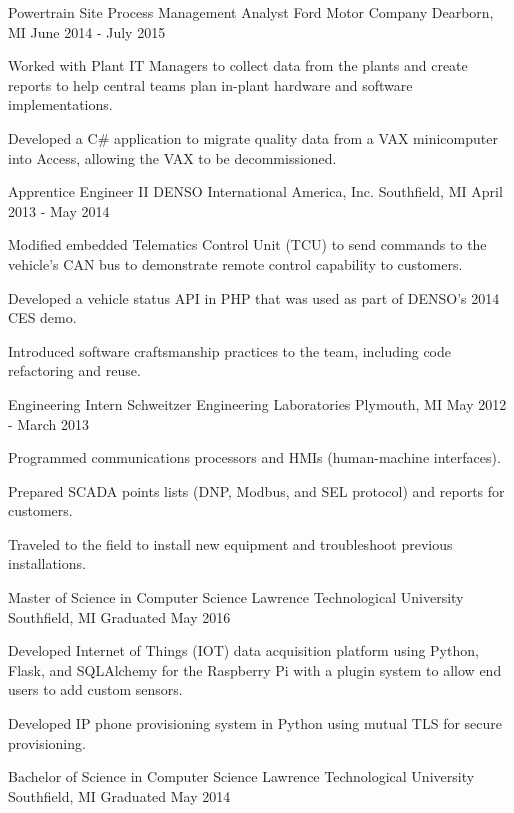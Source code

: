\documentclass[11pt, a4paper]{awesome-cv}
\begin{document}
\begin{cventries}
	\cventry
	{Powertrain Site Process Management Analyst}
	{Ford Motor Company}
	{Dearborn, MI}
	{June 2014 - July 2015}
	{
		\begin{cvitems}
			\item{Worked with Plant IT Managers to collect data from the plants and create reports to help central teams plan in-plant hardware and software implementations.}
			\item{Developed a C\# application to migrate quality data from a VAX minicomputer into Access, allowing the VAX to be decommissioned.}
		\end{cvitems}
	}
	
	\cventry
	{Apprentice Engineer II}
	{DENSO International America, Inc.}
	{Southfield, MI}
	{April 2013 - May 2014}
	{
		\begin{cvitems}
			\item{Modified embedded Telematics Control Unit (TCU) to send commands to the vehicle's CAN bus to demonstrate remote control capability to customers.}
			\item{Developed a vehicle status API in PHP that was used as part of DENSO's 2014 CES demo.}
			\item{Introduced software craftsmanship practices to the team, including code refactoring and reuse.}
		\end{cvitems}
	}
	
	\cventry
	{Engineering Intern}
	{Schweitzer Engineering Laboratories}
	{Plymouth, MI}
	{May 2012 - March 2013}
	{
		\begin{cvitems}
			\item{Programmed communications processors and HMIs (human-machine interfaces).}
			\item{Prepared SCADA points lists (DNP, Modbus, and SEL protocol) and reports for customers.}
			\item{Traveled to the field to install new equipment and troubleshoot previous installations.}
		\end{cvitems}
	}
\end{cventries}

\begin{cventries}
	\cventry
	{Master of Science in Computer Science}
	{Lawrence Technological University}
	{Southfield, MI}
	{Graduated May 2016}
	{
		\begin{cvitems}
			\item{Developed Internet of Things (IOT) data acquisition platform using Python, Flask, and SQLAlchemy for the Raspberry Pi with a plugin system to allow end users to add custom 
				  sensors.}
			\item{Developed IP phone provisioning system in Python using mutual TLS for secure provisioning.}
		\end{cvitems}
	}
	
	\cventry
	{Bachelor of Science in Computer Science}
	{Lawrence Technological University}
	{Southfield, MI}
	{Graduated May 2014}
	{}
\end{cventries}
\end{document}
